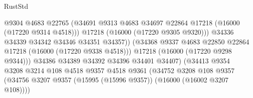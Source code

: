 \begin{lexlean}{RustStd}
\begin{coremodule}
                                              @9304
                                              @4683
                                              @22765
                                              (@34691
                                                @9313
                                                @4683
                                                @34697
                                                @22864
                                                @17218
                                                (@16000 (@17220 @9314 @4518)))
                                              @17218
                                              (@16000 (@17220 @9305 @9320)))
                                            @34336
                                            @34339
                                            @34342
                                            @34346
                                            @34351
                                            @34357))
                                        (@34368
                                          @9337
                                          @4683
                                          @22850
                                          @22864
                                          @17218
                                          (@16000 (@17220 @9338 @4518)))
                                        @17218
                                        (@16000 (@17220 @9298 @9344)))
                                      @34386
                                      @34389
                                      @34392
                                      @34396
                                      @34401
                                      @34407)
                                    (@34413
                                      @9354
                                      @3208
                                      @3214
                                      @108
                                      @4518
                                      @9357
                                      @4518
                                      @9361
                                      (@34752
                                        @3208
                                        @108
                                        @9357
                                        (@34756
                                          @3207
                                          @9357
                                          (@15995 (@15996 @9357))
                                          (@16000 (@16002 @3207 @108))))

\end{coremodule}
\end{lexlean}
